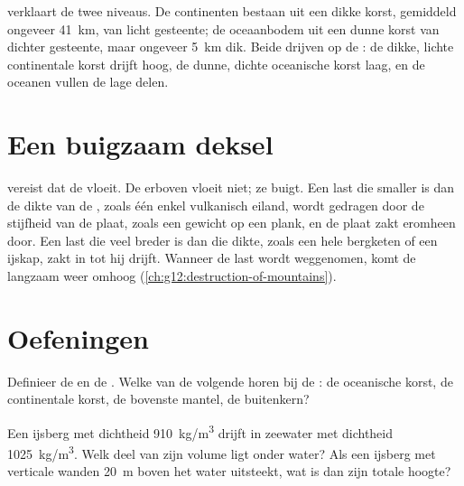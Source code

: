  verklaart de twee niveaus. De continenten bestaan uit een dikke korst,
gemiddeld ongeveer \qty{41}{km}, van licht gesteente; de oceaanbodem uit een dunne
korst van dichter gesteente, maar ongeveer \qty{5}{km} dik. Beide drijven op de
: de dikke, lichte continentale korst drijft hoog, de dunne, dichte
oceanische korst laag, en de oceanen vullen de lage delen.

\section{Een buigzaam deksel}

 vereist dat de  vloeit. De  erboven vloeit niet;
ze buigt. Een last die smaller is dan de dikte van de , zoals één enkel
vulkanisch eiland, wordt gedragen door de stijfheid van de plaat, zoals een
gewicht op een plank, en de plaat zakt eromheen door. Een last die veel breder is
dan die dikte, zoals een hele bergketen of een ijskap, zakt in tot hij drijft.
Wanneer de last wordt weggenomen, komt de  langzaam weer omhoog
(\cref{ch:g12:destruction-of-mountains}).

\section{Oefeningen}

\begin{exercise}[$\star$]\label{exo:g11:lithosphere-asthenosphere:1}
Definieer de  en de . Welke van de volgende horen bij de
: de oceanische korst, de continentale korst, de bovenste mantel, de
buitenkern?
\end{exercise}

\begin{exercise}[$\star$]\label{exo:g11:lithosphere-asthenosphere:2}
Een ijsberg met dichtheid \qty{910}{kg/m^3} drijft in zeewater met dichtheid
\qty{1025}{kg/m^3}. Welk deel van zijn volume ligt onder water? Als een ijsberg
met verticale wanden \qty{20}{m} boven het water uitsteekt, wat is dan zijn
totale hoogte?
\end{exercise}

